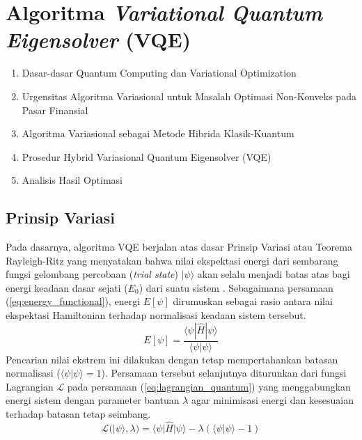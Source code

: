 \section{Algoritma \textit{Variational Quantum Eigensolver} (VQE)}

\begin{enumerate}
    \item Dasar-dasar Quantum Computing dan Variational Optimization
    \item Urgensitas Algoritma Variasional untuk Masalah Optimasi Non-Konveks pada Pasar Finansial
    \item Algoritma Variasional sebagai Metode Hibrida Klasik-Kuantum
    \item Prosedur Hybrid Variasional Quantum Eigensolver (VQE)
    \item Analisis Hasil Optimasi
\end{enumerate}

\subsection{Prinsip Variasi}

Pada dasarnya, algoritma VQE berjalan atas dasar Prinsip Variasi atau Teorema Rayleigh-Ritz yang menyatakan bahwa nilai ekspektasi energi dari sembarang fungsi gelombang percobaan (\textit{trial state}) $|\psi\rangle$ akan selalu menjadi batas atas bagi energi keadaan dasar sejati ($E_0$) dari suatu sistem \cite{wang_achieving_2025}. Sebagaimana persamaan (\ref{eq:energy_functional}), energi $E[\psi]$ dirumuskan sebagai rasio antara nilai ekspektasi Hamiltonian terhadap normalisasi keadaan sistem tersebut.
\begin{equation}
E[\psi] = \frac{\langle \psi | \hat{H} | \psi \rangle}{\langle \psi | \psi \rangle}
\label{eq:energy_functional}
\end{equation}
Pencarian nilai ekstrem ini dilakukan dengan tetap mempertahankan batasan normalisasi ($\langle \psi | \psi \rangle = 1$). Persamaan tersebut selanjutnya diturunkan dari fungsi Lagrangian $\mathcal{L}$ pada persamaan (\ref{eq:lagrangian_quantum}) yang menggabungkan energi sistem dengan parameter bantuan $\lambda$ agar minimisasi energi dan kesesuaian terhadap batasan tetap seimbang.
\begin{equation}
\mathcal{L}(|\psi\rangle, \lambda) = \langle \psi | \hat{H} | \psi \rangle - \lambda (\langle \psi | \psi \rangle - 1)
\label{eq:lagrangian_quantum}
\end{equation}

